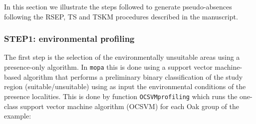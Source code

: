 \documentclass[10pt,a4paper]{article}\usepackage[]{graphicx}\usepackage[]{color}
\begin{document}
In this section we illustrate the steps followed to generate pseudo-absences following the RSEP, TS and TSKM procedures described in the manuscript. 

\subsubsection{STEP1: environmental profiling}

The first step is the selection of the environmentally unsuitable areas using a presence-only algorithm. In \texttt{mopa} this is done using a support vector machine-based algorithm that performs a preliminary binary classification of the study region (suitable/unsuitable) using as input the environmental conditions of the presence localities. This is done by function \texttt{OCSVMprofiling} which runs the one-class support vector machine algorithm (OCSVM) for each Oak group of the example:
\end{document}
